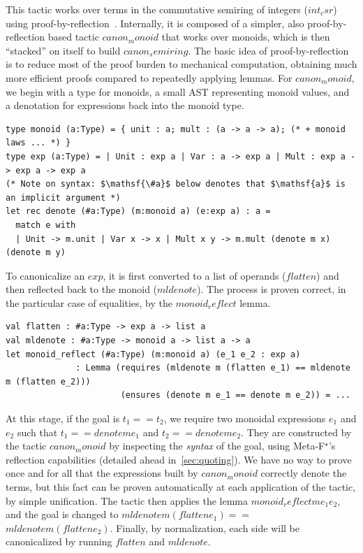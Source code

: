 \documentclass[runningheads]{llncs}
\newcommand\metafstar{Meta-F$^\star$\xspace}
\begin{document}
%
This tactic works over terms in the commutative semiring of integers
(\ls$int_csr$) using proof-by-reflection~\cite{GregoireM05, gonthier2008formal,ChaiebN08,Besson06}.
%
Internally, it is composed of a simpler, also proof-by-reflection based 
tactic \ls$canon_monoid$ that
works over monoids, which is then ``stacked'' on itself to build
\ls$canon_semiring$.
%
The basic idea of proof-by-reflection is to reduce most of the proof
burden to mechanical computation, obtaining much more efficient proofs
compared to repeatedly applying lemmas.
%
For \ls$canon_monoid$, we begin with
a type for monoids,
a small AST representing monoid values, and
a denotation for expressions back into the monoid type.
%
\begin{lstlisting}
type monoid (a:Type) = { unit : a; mult : (a -> a -> a); (* + monoid laws ... *) }
type exp (a:Type) = | Unit : exp a | Var : a -> exp a | Mult : exp a -> exp a -> exp a
(* Note on syntax: $\mathsf{\#a}$ below denotes that $\mathsf{a}$ is an implicit argument *)
let rec denote (#a:Type) (m:monoid a) (e:exp a) : a =
  match e with
  | Unit -> m.unit | Var x -> x | Mult x y -> m.mult (denote m x) (denote m y)
\end{lstlisting}
%
To canonicalize an \ls$exp$, it is first converted to a
list of operands (\ls$flatten$) and then reflected back to the monoid
(\ls$mldenote$).
%
The process is proven correct, in the particular case
of equalities, by the \ls$monoid_reflect$ lemma.
%
%
%
%
\begin{lstlisting}
val flatten : #a:Type -> exp a -> list a
val mldenote : #a:Type -> monoid a -> list a -> a
let monoid_reflect (#a:Type) (m:monoid a) (e_1 e_2 : exp a)
              : Lemma (requires (mldenote m (flatten e_1) == mldenote m (flatten e_2)))
                       (ensures (denote m e_1 == denote m e_2)) = ...
\end{lstlisting}
%
At this stage, if the goal is \ls$t_1 == t_2$, we require two
monoidal expressions \ls$e_1$ and \ls$e_2$ such that
\ls$t_1 == denote m e_1$ and \ls$t_2 == denote m e_2$.
%
They are constructed by the tactic \ls$canon_monoid$ by inspecting
the \emph{syntax} of the goal, using \metafstar's reflection
capabilities (detailed ahead in~\autoref{sec:quoting}).
%
We have no way to prove once and for all that the expressions built by
\ls$canon_monoid$ correctly denote the terms, but this fact can be
proven automatically at each application of the tactic, by simple unification.
%
The tactic then applies the lemma \ls$monoid_reflect m e_1 e_2$,
and the goal is changed to \ls$mldenote m (flatten e_1) ==$ \ls$mldenote m (flatten e_2)$.
%
Finally, by normalization, each side will be
canonicalized by running \ls$flatten$ and \ls$mldenote$.
\end{document}
